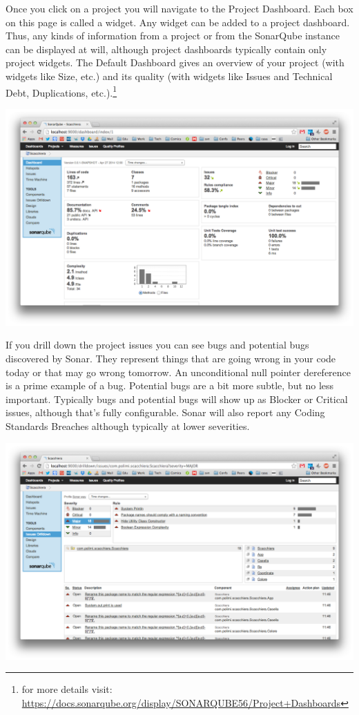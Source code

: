 \documentclass{article}
\begin{document}
Once you click on a project you will navigate to the Project Dashboard. 
Each box on this page is called a widget. Any widget can be added to a
project dashboard. Thus, any kinds of information from a project or
from the SonarQube instance can be displayed at will, although project
dashboards typically contain only project widgets.
The Default Dashboard gives an overview of your project (with widgets
like Size, etc.) and its quality (with widgets like Issues and
Technical Debt, Duplications, etc.).\footnote{for more details visit: \url{https://docs.sonarqube.org/display/SONARQUBE56/Project+Dashboards}}
\begin{center}
\includegraphics[scale=0.3]{figures/ss2.png}
\end{center}

If you drill down the project issues you can see bugs and potential
bugs discovered by Sonar. They represent things that are going wrong
in your code today or that may go wrong tomorrow. An unconditional
null pointer dereference is a prime example
of a bug. Potential bugs are a bit more subtle, but no less important. 
Typically bugs and potential bugs will show up as Blocker or Critical issues,
although that's fully configurable. 
Sonar will also report any Coding Standards Breaches although
typically at lower severities.
\begin{center}
\includegraphics[scale=0.3]{figures/ss3.png}
\end{center}
\end{document}
